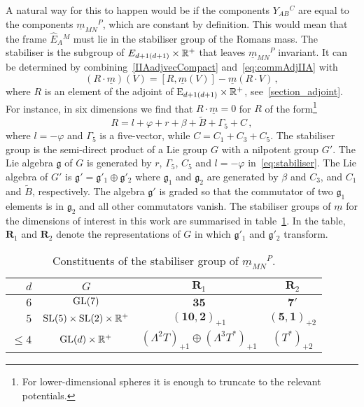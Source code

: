 \documentclass[debug]{phd}
\begin{document}
				A natural way for this to happen would be if the components $Y_{AB}{}^C$ are equal to the components $\underline{m}_{MN}{}^P$, which are constant by definition.
				This would mean that the frame $\hat{E}_A{}^M$ must lie in the stabiliser group of the Romans mass. 
				The stabiliser is the subgroup of $E_{d+1(d+1)} \times\mathbb{R}^+$ that leaves $\underline{m}_{MN}{}^P$ invariant. It can be determined by combining~\eqref{IIAadjvecCompact} and~\eqref{eq:commAdjIIA} with %
							\begin{equation}
								(R\cdot \underline{m}) (V) = [ R, \underline{m}(V) ] - \underline{m} (R\cdot V) \, ,
							\end{equation}
				where $R$ is an element of the adjoint of $\mathrm{E}_{d+1(d+1)}\times\mathbb{R}^+$, see~\eqref{section_adjoint}. 
				For instance, in six dimensions we find that $R \cdot \underline{m} = 0$ for $R$ of the form\footnote{For lower-dimensional spheres it is enough to truncate to the relevant potentials.}
							\begin{equation}\label{eq:stabiliser}
								R = l + \varphi + r + \beta + \tilde B + \Gamma_5 + C \, ,
							\end{equation}
				where $l = -\varphi$ and $\Gamma_5$ is a five-vector, while $C=C_1+ C_3 + C_5$. 
				The stabiliser group is the semi-direct product of a Lie group $G$ with a nilpotent group $G'$. 
				The Lie algebra $\mathfrak{g}$ of $G$ is generated by $r$, $\Gamma_5$, $C_5$ and $l = -\varphi$ in~\eqref{eq:stabiliser}. 
				The Lie algebra of $G'$ is $\mathfrak{g}' = \mathfrak{g}'_1 \oplus \mathfrak{g}'_2$ where $\mathfrak{g}_1$ and $\mathfrak{g}_2$ are generated by $\beta$ and $C_3$, and $C_1$ and $\tilde{B}$, respectively.
				The algebra $\mathfrak{g}'$ is graded so that the commutator of two $\mathfrak{g}_1$ elements is in $\mathfrak{g}_2$ and all other commutators vanish.
				The stabiliser groups of $\underline{m}$ for the dimensions of interest in this work are summarised in table~\ref{tab:stab}. 
				In the table, $\mathbf{R}_1$ and $\mathbf{R}_2$ denote the representations of $G$ in which $\mathfrak{g}'_1$ and $\mathfrak{g}'_2$ transform.
						\begin{table}[h]
						\centering
							\begin{tabular}{rccc}
									$d$ & $G$ & $\mathbf{R}_1$ & $\mathbf{R}_2$ \\ 
									\hline
 										$6$ & $\mathrm{GL}(7)$ & $\mathbf{35}$ & $\mathbf{7'}$ \\
		 								$5$ & $\mathrm{SL}(5)\times\mathrm{SL}(2)\times\mathbb{R}^+$ & $(\mathbf{10},\mathbf{2})_{+1}$ & $(\mathbf{5},\mathbf{1})_{+2}$ \\
										$\leq 4$ & $\mathrm{GL}(d) \times \mathbb{R}^+$ & $(\Lambda^2 T)_{+1} \oplus (\Lambda^3 T^*)_{+1}$ & $(T^*)_{+2}$
							\end{tabular}
						\caption{Constituents of the stabiliser group of $\underline{m}_{MN}{}^P$.}
						\label{tab:stab}
						\end{table}
\end{document}

